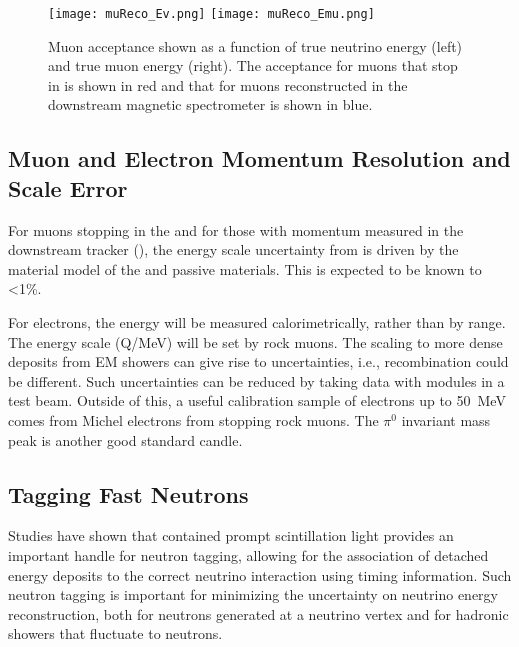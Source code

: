 \begin{figure}[h!]
   \begin{center}
      \texttt{[image: muReco\_Ev.png]}
      \texttt{[image: muReco\_Emu.png]}
      \caption{Muon acceptance shown as a function of true neutrino energy (left) and true muon energy (right).  The acceptance for muons that stop in  is shown in red and that for muons reconstructed in the downstream magnetic spectrometer is shown in blue.}
      \label{fig:muonacc}
   \end{center}
\end{figure}

\subsection{Muon and Electron Momentum Resolution and Scale Error}


For muons stopping in the  and for those with momentum measured in the downstream tracker (), the energy scale uncertainty from  is driven by the material model of the  and passive materials.  This is expected to be known to \textless 1\%.

For electrons, the energy will be measured calorimetrically, rather than by range.  The  energy scale (Q/MeV) will be set by rock muons.  The scaling to more dense deposits from EM showers can give rise to uncertainties, i.e., recombination could be different.  Such uncertainties can be reduced by taking data with  modules in a test beam.  Outside of this, a useful calibration sample
of electrons up to \SI{50}{MeV} comes from Michel electrons from stopping rock muons. The $\pi^0$ invariant mass peak is another good standard candle.



\subsection{Tagging Fast Neutrons}

Studies have shown that contained prompt scintillation light provides an important handle for neutron tagging, allowing for the association of detached energy deposits to the correct neutrino interaction using timing information. Such neutron tagging is important for minimizing the uncertainty on neutrino energy reconstruction, both for neutrons generated at a neutrino vertex and for hadronic showers that fluctuate to neutrons. 

